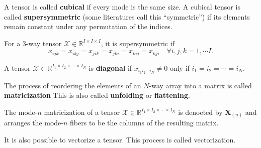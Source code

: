 \documentclass[preprint]{elsarticle}
\begin{document}
\begin{defn}
    A tensor is called \textbf{cubical} if every mode is the same size. A cubical tensor is called \textbf{supersymmetric}
    (some literatures call this ``symmetric'') if its elements remain constant under any permutation of the indices.
\end{defn}
For a $3$-way tensor $\boldsymbol{\mathscr{X}}\in\mathbb{R}^{I\times I\times I}$, it is supersymmetric if
\[
    x_{ijk} = x_{ikj} = x_{jik} = x_{jki} = x_{kij} = x_{kji} \quad \forall i,j,k=1,\cdots I.
\]
\begin{defn}
    A tensor $\boldsymbol{\mathscr{X}}\in\mathbb{R}^{I_1\times I_2\times\cdots\times I_N}$ is \textbf{diagonal}
    if $x_{i_1i_2\cdots i_N}\neq 0$ only if $i_1=i_2=\cdots=i_N$. 
\end{defn}
\begin{defn}[Matricization]
    The process of reordering the elements of an $N$-way array into a matrix is called \textbf{matricization}
This is also called \textbf{unfolding} or \textbf{flattening}.
\end{defn}
The mode-$n$ matricization of a tensor $\boldsymbol{\mathscr{X}}\in\mathbb{R}^{I_1\times I_2\times\cdots\times I_N}$
is denoeted by $\mathbf{X}_{(n)}$ and arranges the mode-$n$ fibers to be the columns of the resulting matrix.
\begin{rmk}
    It is also possible to vectorize a tensor. This process is called vectorization.
\end{rmk}
\end{document}
